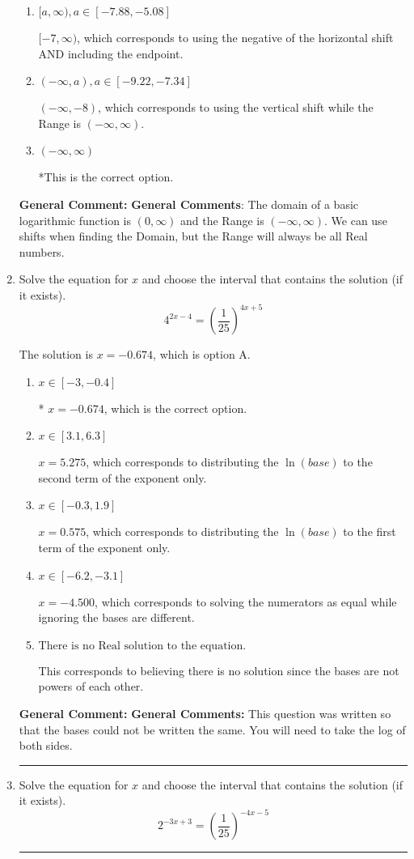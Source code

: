 \documentclass{extbook}[14pt]
\newcommand{\litem}[1]{\item #1

\rule{\textwidth}{0.4pt}}
\begin{document}
\begin{enumerate}
{\begin{enumerate}[label=\Alph*.]
$(-\infty, 8)$, which corresponds to using the using the negative of vertical shift on $(0, \infty)$.
\item \( [a, \infty), a \in [-7.88, -5.08] \)

$[-7, \infty)$, which corresponds to using the negative of the horizontal shift AND including the endpoint.
\item \( (-\infty, a), a \in [-9.22, -7.34] \)

$(-\infty, -8)$, which corresponds to using the vertical shift while the Range is $(-\infty, \infty)$.
\item \( (-\infty, \infty) \)

*This is the correct option.
\end{enumerate}

\textbf{General Comment:} \textbf{General Comments}: The domain of a basic logarithmic function is $(0, \infty)$ and the Range is $(-\infty, \infty)$. We can use shifts when finding the Domain, but the Range will always be all Real numbers.
}
\litem{
Solve the equation for $x$ and choose the interval that contains the solution (if it exists).
\[ 4^{2x-4} = \left(\frac{1}{25}\right)^{4x+5} \]

The solution is \( x = -0.674 \), which is option A.\begin{enumerate}[label=\Alph*.]
\item \( x \in [-3, -0.4] \)

* $x = -0.674$, which is the correct option.
\item \( x \in [3.1, 6.3] \)

$x = 5.275$, which corresponds to distributing the $\ln(base)$ to the second term of the exponent only.
\item \( x \in [-0.3, 1.9] \)

$x = 0.575$, which corresponds to distributing the $\ln(base)$ to the first term of the exponent only.
\item \( x \in [-6.2, -3.1] \)

$x = -4.500$, which corresponds to solving the numerators as equal while ignoring the bases are different.
\item \( \text{There is no Real solution to the equation.} \)

This corresponds to believing there is no solution since the bases are not powers of each other.
\end{enumerate}

\textbf{General Comment:} \textbf{General Comments:} This question was written so that the bases could not be written the same. You will need to take the log of both sides.
}
\litem{
Solve the equation for $x$ and choose the interval that contains the solution (if it exists).
\[ 2^{-3x+3} = \left(\frac{1}{25}\right)^{-4x-5} \]

}
\end{enumerate}
\end{document}
